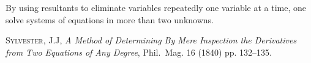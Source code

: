 \documentclass[12pt]{article}
\begin{document}
By using resultants to eliminate variables repeatedly one variable at a time, one solve systems of equations in more than two unknowns.

\begin{thebibliography}{1}
{\scshape Sylvester, J.J},
\emph{A Method of Determining By Mere Inspection the Derivatives from Two Equations of Any Degree},
Phil.\ Mag. 16 (1840) pp. 132--135.
\end{thebibliography}
\end{document}
